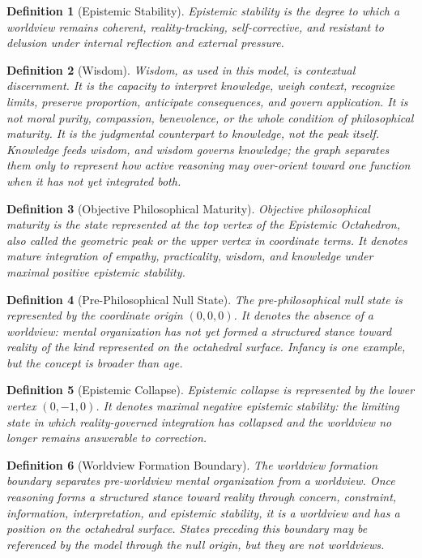 \documentclass[11pt]{article}
\newtheorem{definition}{Definition}
\begin{document}
\begin{definition}[Epistemic Stability]
Epistemic stability is the degree to which a worldview remains coherent, reality-tracking, self-corrective, and resistant to delusion under internal reflection and external pressure.
\end{definition}

\begin{definition}[Wisdom]
Wisdom, as used in this model, is contextual discernment. It is the capacity to interpret knowledge, weigh context, recognize limits, preserve proportion, anticipate consequences, and govern application. It is not moral purity, compassion, benevolence, or the whole condition of philosophical maturity. It is the judgmental counterpart to knowledge, not the peak itself. Knowledge feeds wisdom, and wisdom governs knowledge; the graph separates them only to represent how active reasoning may over-orient toward one function when it has not yet integrated both.
\end{definition}

\begin{definition}[Objective Philosophical Maturity]
Objective philosophical maturity is the state represented at the top vertex of the Epistemic Octahedron, also called the geometric peak or the upper vertex in coordinate terms. It denotes mature integration of empathy, practicality, wisdom, and knowledge under maximal positive epistemic stability.
\end{definition}

\begin{definition}[Pre-Philosophical Null State]
The pre-philosophical null state is represented by the coordinate origin $(0,0,0)$. It denotes the absence of a worldview: mental organization has not yet formed a structured stance toward reality of the kind represented on the octahedral surface. Infancy is one example, but the concept is broader than age.
\end{definition}

\begin{definition}[Epistemic Collapse]
Epistemic collapse is represented by the lower vertex $(0,-1,0)$. It denotes maximal negative epistemic stability: the limiting state in which reality-governed integration has collapsed and the worldview no longer remains answerable to correction.
\end{definition}

\begin{definition}[Worldview Formation Boundary]
The worldview formation boundary separates pre-worldview mental organization from a worldview. Once reasoning forms a structured stance toward reality through concern, constraint, information, interpretation, and epistemic stability, it is a worldview and has a position on the octahedral surface. States preceding this boundary may be referenced by the model through the null origin, but they are not worldviews.
\end{definition}
\end{document}
